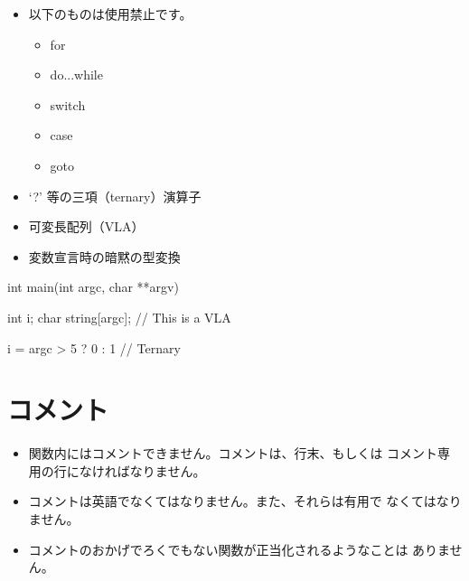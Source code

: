 \documentclass{42-ja}
\begin{document}
        \begin{itemize}

            \item 以下のものは使用禁止です。

                \begin{itemize}

                    \item for
                    \item do...while
                    \item switch
                    \item case
                    \item goto

                \end{itemize}

            \item `?' 等の三項（ternary）演算子

            \item 可変長配列（VLA）

            \item 変数宣言時の暗黙の型変換

        \end{itemize}
        \begin{42ccode}
    int main(int argc, char **argv)
    {
        int     i;
        char    string[argc]; // This is a VLA

        i = argc > 5 ? 0 : 1 // Ternary
    }
        \end{42ccode}
        \newpage

    \section{コメント}

        \begin{itemize}

            \item 関数内にはコメントできません。コメントは、行末、もしくは
				コメント専用の行になければなりません。

            \item コメントは英語でなくてはなりません。また、それらは有用で
				なくてはなりません。

            \item コメントのおかげでろくでもない関数が正当化されるようなことは
				ありません。

        \end{itemize}
        \newpage
\end{document}
